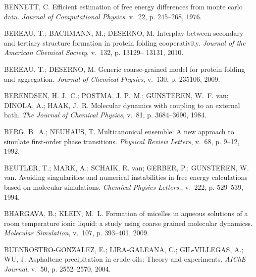\documentclass[
	12pt,				%
	openany,			%
	oneside,			%
	a4paper,			%
	english,			%
	brazil				%
	]{abntex2}
\begin{document}
\begin{thebibliography}{}
{BENNETT, C. Efficient estimation of free energy differences from monte carlo
  data.
\emph{Journal of Computational Physics}, v.~22, p. 245–268, 1976.}

{BEREAU, T.; BACHMANN, M.; DESERNO, M. Interplay between secondary and tertiary
  structure formation in protein folding cooperativity.
\emph{Journal of the American Chemical Society}, v.~132, p. 13129– 13131,
  2010.}

{BEREAU, T.; DESERNO, M. Generic coarse-grained model for protein folding and
  aggregation.
\emph{Journal of Chemical Physics}, v.~130, p. 235106, 2009.}

{BERENDSEN, H. J.~C.; POSTMA, J. P.~M.; GUNSTEREN, W.~F. van; DINOLA, A.; HAAK,
  J.~R. Molecular dynamics with coupling to an external bath.
\emph{The Journal of Chemical Physics}, v.~81, p. 3684--3690, 1984.}

{BERG, B.~A.; NEUHAUS, T. Multicanonical ensemble: A new approach to simulate
  first-order phase transitions.
\emph{Physical Review Letters}, v.~68, p. 9--12, 1992.}

{BEUTLER, T.; MARK, A.; SCHAIK, R. van; GERBER, P.; GUNSTEREN, W. van. Avoiding
  singularities and numerical instabilities in free energy calculations based
  on molecular simulations.
\emph{Chemical Physics Letters.}, v.~222, p. 529–539, 1994.}

{BHARGAVA, B.; KLEIN, M.~L. Formation of micelles in aqueous solutions of a
  room temperature ionic liquid: a study using coarse grained molecular
  dynamicss.
\emph{Molecular Simulation}, v.~107, p. 393--401, 2009.}

{BUENROSTRO-GONZALEZ, E.; LIRA-GALEANA, C.; GIL-VILLEGAS, A.; WU, J. Asphaltene
  precipitation in crude oils: Theory and experiments.
\emph{AIChE Journal}, v.~50, p. 2552--2570, 2004.}


\end{thebibliography}
\end{document}
